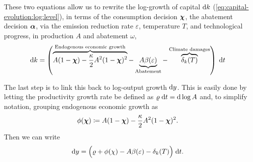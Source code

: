 \documentclass[../../main.tex]{subfiles}
\begin{document}
These two equations allow us to rewrite the log-growth of capital $\mathrm{d}k$ (\ref{eq:capital-evolution:log:level}), in terms of the consumption decision $\bm{\chi}$, the abatement decision $\bm{\alpha}$, via the emission reduction rate $\varepsilon$, temperature $T$, and technological progress, in production $A$ and abatement $\omega$, \begin{equation} \label{eq:capital-evolution:log:growth}
    \mathrm{d}k = \left( \overbrace{A (1 - \bm{\chi}) - \frac{\kappa}{2} A^2 (1 - \bm{\chi})^2}^{\text{Endogenous economic growth}} - \underbrace{A \beta(\varepsilon)}_{\text{Abatement}} - \overbrace{\delta_k(T)}^{\text{Climate damages}} \right) \; \mathrm{d}t
\end{equation} 

The last step is to link this back to log-output growth $\mathrm{d}y$. This is easily done by letting the productivity growth rate be defined as $\varrho \; \mathrm{d}t = \mathrm{d}\log A$ and, to simplify notation, grouping endogenous economic growth as \begin{equation}
    \phi(\bm{\chi}) \coloneqq A (1 - \bm{\chi}) - \frac{\kappa}{2} A^2 (1 - \bm{\chi})^2.
\end{equation} Then we can write \begin{equation} \label{eq:output-evolution:log}
    \mathrm{d}y = \Big(\varrho + \phi(\chi) - A \beta(\varepsilon) - \delta_k(T) \Big) \; \mathrm{d}t.
\end{equation}
\end{document}
